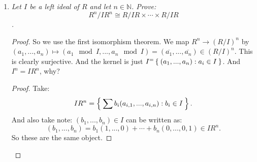 \documentclass[12pt]{amsbook}
\theoremstyle{plain}
\numberwithin{section}{chapter}
\numberwithin{equation}{chapter}
\theoremstyle{definition}
\theoremstyle{remark}
\newcommand{\n}{\mathbb{N}}
\newcommand{\bee}{\begin{equation}\begin{aligned}}
\newcommand{\eee}{\end{aligned}\end{equation}}
\renewcommand{\phi}{\varphi}
\begin{document}
\begin{enumerate}[label=\arabic*.]
\begin{proof}
\bee
	\phi(r((x_1,...,x_n) + B)) 
	&= \phi(r(x_1,...,x_n) + B)\\
	&= \phi(rx_1,...,rx_n) + B)\\
	&= (rx_1 + B,...,rx_n + B)\\
	&= r(x_1 + B,...,x_n + B)\\
	&= r\phi((x_1,...,x_n) + B),
\eee
 so $\phi$ is a homomorphism. \\ 
\textbf{Injection: } Let $(x_1,x_2,...,x_n) + B,(y_1,y_2,...,y_n) + B \in A/B$, and let 
\begin{equation}
\begin{aligned}
\phi((x_1,x_2,...,x_n) + B) &= \phi((y_1,y_2,...,y_n) + B)\\
\Rightarrow  (x_1+B_1,x_2+B_2,...,x_n+B_n)&=(y_1+B_1,y_2+B_2,...,y_n+B_n). 
\end{aligned}
\end{equation}
So then we have that $x_i+B_i = y_i+B_i$ for all $i$, thus
 \begin{equation}
\begin{aligned}(y_1,y_2,...,y_n) + B &= (y_1,y_2,...,y_n)+(B_1 \times B_2 \times \cdots \times B_n)=
(y_1+B_1 \times y_2+B_2 \times \cdots \times y_n+B_n) \\
&= (x_1+B_1 \times x_2+B_2 \times \cdots \times x_n+B_n) = (x_1,x_2,...,x_n) + B
\end{aligned}
\end{equation}
 by the direct product operation, so $\phi$ is in injective. \\
\textbf{Surjection: } Let $(a_1+B_1,a_2+B_2,...,a_n+B_n) \in C$. Then we must have that $a_i \in A_i$ for all $i$ by definition of $C$ and the quotient modules $A_i/B_i$, so $(a_1,a_2,...,a_n) \in A \Rightarrow (a_1,a_2,...,a_n) + B \in A/B$, and $\phi((a_1,a_2,...,a_n) + B) = (a_1+B_1,a_2+B_2,...,a_n+B_n)$, so $\phi$ is surjective by definition. Hence $\phi$ is an isomorphism, and $A/B \cong C$. 
\end{proof}

\item \textit{Let $I$ be a left ideal of $R$ and let $n \in \n$. Prove: 
$$
R^n/IR^n \cong R/IR \times \cdots \times R/IR
$$. }
\begin{proof}
So we use the first isomorphism theorem. We map $R^n \to (R/I)^n$ by $(a_1,...,a_n) \mapsto (a_1 \mod I,...,a_n \mod I) = (\overline{a_1},...,\overline{a_n}) \in (R/I)^n$. This is clearly surjective. And the kernel is just $I^ = \Set{(a_1,...,a_n): a_i \in I}$. And $I^n = IR^n$, why? \begin{proof}Take:
 $$
 IR^n = \Set{\sum b_i(a_{i,1},...,a_{i,n}):b_i \in I}.
 $$
 And also take note:
 $
 (b_1,...,b_n) \in I$ can be written as:
 $$
 (b_1,...,b_n) = b_1(1,...,0) + \cdots + b_n(0,...,0,1) \in IR^n.
 $$
 So these are the same object. 
 \end{proof}
\end{proof}




\end{enumerate}
\end{document}
